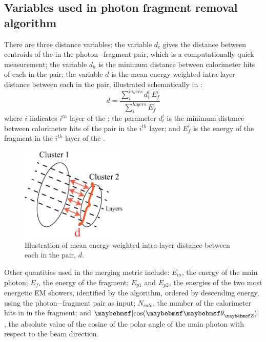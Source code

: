 \subsection{Variables used in photon fragment removal algorithm}

There are three distance variables: the variable $d_c$ gives the distance between centroids of the \PFO in the photon$-$fragment pair, which is a computationally quick measurement;  the variable  $d_h$ is the minimum distance between calorimeter hits of each \PFO in the pair;  the variable  $d$ is the mean energy weighted intra-layer distance between  each \PFO in the pair, illustrated schematically in :
\begin{equation}
d = \frac{\sum_{i}^{layers}d_l^i \ E_{f}^i}{\sum_{i}^{layers}E_{f}^i}
\end{equation}
where $i$ indicates $i^{th}$ layer of the \ECAL; the parameter $d_{l}^i$ is the minimum distance between calorimeter hits of the pair in the $i^{th}$ layer; and $E_{f}^i$ is the energy of the fragment in the $i^{th}$ layer of the \ECAL.

\begin{figure}[tbph]
\centering
\includegraphics[width=0.45\textwidth]{photon/dLayer2}
\caption{Illustration of  mean energy weighted intra-layer distance between  each \PFO in the pair, $d$.}
\label{fig:photonDistanceMetric}
\end{figure}

Other quantities used in the merging metric include: $E_m$, the energy of the main photon; $E_f$,  the energy of the fragment; $E_{p1}$ and $E_{p2}$, the energies of the two most energetic EM showers,  identified by the \peakFinding algorithm, ordered by descending energy, using the photon$-$fragment pair as input; $N_{calo}$, the number of the calorimeter  hits in \ECAL in the fragment; and $\absCosTheta$, the absolute value of the cosine of the polar angle of the main photon with respect to the beam direction.


